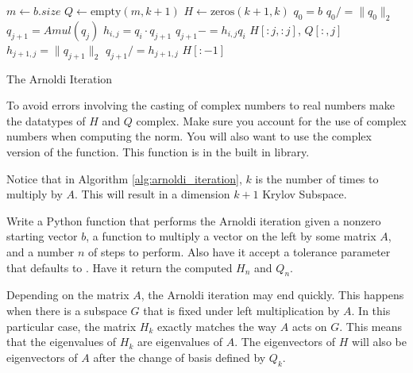 \begin{algorithm}
\begin{algorithmic}[1]
	\State $m \gets b.size$						
	\State $Q \gets \text{empty}\left(m, k+1\right)$
	\State $H \gets \text{zeros}\left( k+1, k\right)$
	\State $q_0 = b$							
	\State $q_0 /= \|q_0\|_2$						
								
		\State $q_{j+1} = Amul \left(q_j\right)$		
							
			\State $h_{i,j} = q_i \cdot q_{j+1}$		
			\State $q_{j+1} -= h_{i,j} q_i$
		\EndFor
							
			\State {} $H[:j,:j]$, $Q[:,j]$
		\EndIf
		\State $h_{j+1,j} = \|q_{j+1}\|_2$			
		\State $q_{j+1} /= h_{j+1,j}$				
	\EndFor
	\State {} $H[:-1]$				
\EndProcedure
\end{algorithmic}
\caption{The Arnoldi Iteration}
\label{alg:arnoldi_iteration}
\end{algorithm}

\begin{warn}
To avoid errors involving the casting of complex numbers to real numbers make the datatypes of $H$ and $Q$ complex.
Make sure you account for the use of complex numbers when computing the norm.
You will also want to use the complex version of the  function.
This function is in the built in  library.
\end{warn}

Notice that in Algorithm \ref{alg:arnoldi_iteration}, $k$ is the number of times to multiply by $A$.
This will result in a dimension $k+1$ Krylov Subspace.

\begin{problem}
Write a Python function that performs the Arnoldi iteration given a nonzero starting vector $b$, a function to multiply a vector on the left by some matrix $A$, and a number $n$ of steps to perform.
Also have it accept a tolerance parameter that defaults to .
Have it return the computed $H_n$ and $Q_n$.
\end{problem}

\begin{info}
Depending on the matrix $A$, the Arnoldi iteration may end quickly.
This happens when there is a subspace $G$ that is fixed under left multiplication by $A$.
In this particular case, the matrix $H_k$ exactly matches the way $A$ acts on $G$.
This means that the eigenvalues of $H_k$ are eigenvalues of $A$.
The eigenvectors of $H$ will also be eigenvectors of $A$ after the change of basis defined by $Q_k$.
\end{info}

